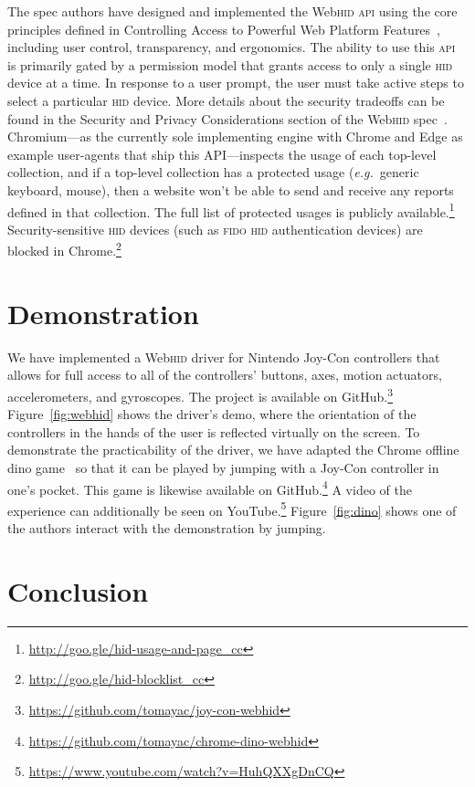 \documentclass[sigconf]{acmart}
\begin{document}
The spec authors have designed and implemented the Web\textsc{hid} \textsc{api}
using the core principles defined in
Controlling Access to Powerful Web Platform Features~\cite{ng19},
including user control, transparency, and ergonomics.
The ability to use this \textsc{api} is primarily gated by a permission model
that grants access to only a single \textsc{hid} device at a time.
In response to a user prompt, the user must take active steps
to select a particular \textsc{hid} device.
More details about the security tradeoffs can be found in
the Security and Privacy Considerations section of the Web\textsc{hid} spec~\cite{hid01}.
Chromium---as the currently sole implementing engine with Chrome and Edge as example user-agents that ship this API---inspects
the usage of each top-level collection,
and if a top-level collection has a protected usage
(\textit{e.g.}\ generic keyboard, mouse), then a website won't be able to send and receive
any reports defined in that collection.
The full list of protected usages is publicly
available.\footnote{\url{http://goo.gle/hid-usage-and-page_cc}}
Security-sensitive \textsc{hid} devices
(such as \textsc{fido} \textsc{hid} authentication devices)
are blocked in Chrome.\footnote{\url{http://goo.gle/hid-blocklist_cc}}

\section{Demonstration}

We have implemented a Web\textsc{hid} driver for Nintendo Joy-Con controllers
that allows for full access to all of the controllers' buttons, axes,
motion actuators, accelerometers, and gyroscopes.
The project is available on GitHub.\footnote{\url{https://github.com/tomayac/joy-con-webhid}}
Figure~\ref{fig:webhid} shows the driver's demo, where the orientation of the controllers
in the hands of the user is reflected virtually on the screen. 
To demonstrate the practicability of the driver, we have adapted the Chrome offline dino game~\cite{dino18}
so that it can be played by jumping with a Joy-Con controller in one's pocket.
This game is likewise available on GitHub.\footnote{\url{https://github.com/tomayac/chrome-dino-webhid}}
A video of the experience can additionally be seen on
YouTube.\footnote{\url{https://www.youtube.com/watch?v=HuhQXXgDnCQ}}
Figure~\ref{fig:dino} shows one of the authors interact with the demonstration
by jumping.

\section{Conclusion}
\end{document}
